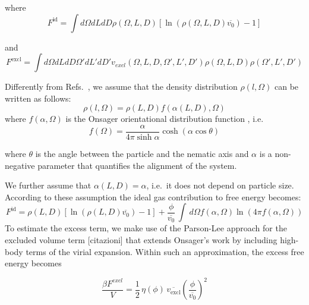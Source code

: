 \documentclass[journal=jacsat,manuscript=article]{achemso}
\begin{document}
where
\begin{equation}
  F^\mathrm{id} = \int d\Omega dL dD \rho(\Omega,L,D) \left [\ln(\rho(\Omega,L,D) \overline{v_0}) - 1 \right]
\end{equation}

and 
\begin{equation}
  F^\mathrm{excl} = \int d\Omega dL dD\Omega' dL' dD' v_{excl}(\Omega,L,D,\Omega',L',D') \rho(\Omega,L,D) \rho(\Omega',L',D')
\end{equation}

Differently from Refs.~\cite{Speranza2002,Wensink2003}, we assume that the density distribution
$\rho(l,\Omega)$ can be written as follows:
\begin{equation}
\rho(l,\Omega) = \rho(L,D) f(\alpha(L,D), \Omega)
\end{equation}
where $f(\alpha,\Omega)$ is the  Onsager orientational distribution function \cite{onsager1949effects}, i.e.
\begin{equation}
	f(\Omega) = \frac{\alpha}{4 \pi \sinh \alpha} \cosh(\alpha \cos \theta)
\end{equation}

where $\theta$ is the angle between the particle and the nematic axis and $\alpha$ is a non-negative parameter that quantifies the alignment of the system.

We further assume that $\alpha(L,D)=\alpha$, i.e.~it does not depend on particle size.
According to these assumption the ideal gas contribution to free energy becomes:
\begin{equation}
  F^\mathrm{id} =  \rho(L,D) \left[\ln(\rho(L,D)\overline{v_0}) - 1\right ] + \frac{\phi}{\overline{v_0}} \, 
  \int \, d\Omega f(\alpha,\Omega) \ln(4 \pi f(\alpha,\Omega))
\end{equation}
To estimate the excess term, we make use of the Parson-Lee approach for the excluded volume term [citazioni] that extends Onsager's work \cite{onsager1949effects} by including high-body terms of the virial expansion. Within such an approximation, the excess free energy becomes 

\begin{equation}
\frac{\beta F^{excl}}{V} = \frac{1}{2} \, \eta(\phi) \, \overline{v_\mathrm{excl}}  \left( \frac{\phi}{\overline{v_0}} \right)^2
\end{equation}

\end{document}
